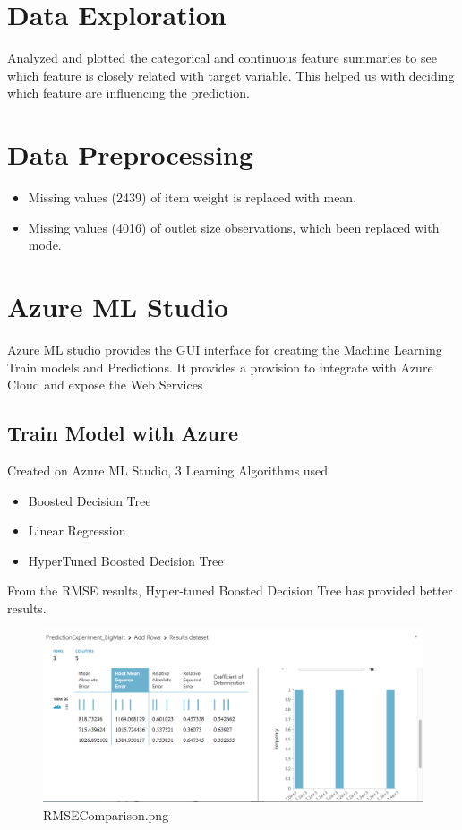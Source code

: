 \section{Data Exploration}
Analyzed and plotted the categorical and continuous feature summaries to 
see which feature is 
closely related with target variable. This helped us with deciding which 
feature are influencing 
the prediction.

\section{Data Preprocessing}
\begin{itemize}
\item Missing values (2439) of item weight is replaced with mean.
\item Missing values (4016) of outlet size observations, which been 
replaced with mode.
\end{itemize}


\section{Azure ML Studio}
Azure ML studio provides the GUI interface for creating the Machine 
Learning Train models and Predictions. It provides a provision to integrate 
with Azure Cloud and expose the Web Services

\subsection{Train Model with Azure}
Created on Azure ML Studio, 3 Learning Algorithms used
\begin{itemize}
\item Boosted Decision Tree
\item Linear Regression
\item HyperTuned Boosted Decision Tree
\end{itemize}

From the RMSE results, Hyper-tuned Boosted Decision Tree has provided better 
results.

\begin{figure}[pic3]
\centering
\includegraphics[width=\columnwidth]{Images/mlstudio/RMSEComparison.png}
\caption{RMSEComparison.png}\label{fig:RMSEComparison}
\end{figure}

